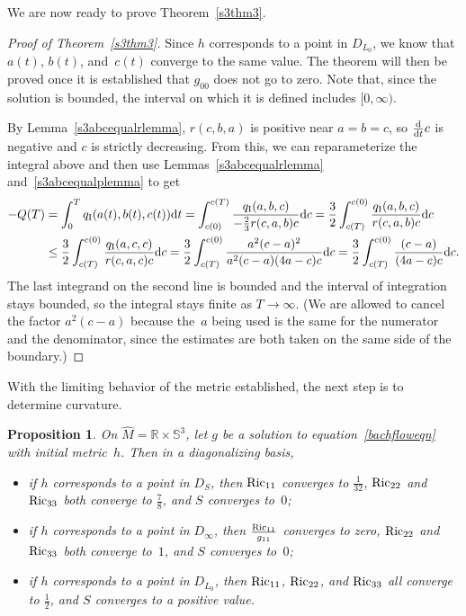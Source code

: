 \documentclass[pdftex]{sigma}
\numberwithin{equation}{section}
\newtheorem{Proposition}[Theorem]{Proposition}
 { \theoremstyle{definition}
\newtheorem{Definition}[Theorem]{Definition}
\newtheorem{Example}[Theorem]{Example}
\newtheorem{Remark}[Theorem]{Remark} }
\newcommand{\dtime}{\frac{{\rm d}}{{\rm d} t}} %
\begin{document}
We are now ready to prove Theorem~\ref{s3thm3}.

\begin{proof}[Proof of Theorem~\ref{s3thm3}]
Since $h$ corresponds to a point in $D_{L_0}$, we know that $a(t)$, $b(t)$, and~$c(t)$ converge to the same value. The theorem will then be proved once it is established that $g_{00}$ does not go to zero.
Note that, since the solution is bounded, the interval on which it is defined includes $[0, \infty)$.

By Lemma~\ref{s3abcequalrlemma}, $r(c, b, a)$ is positive near $a = b = c$, so $\dtime c$ is negative and $c$ is strictly decreasing. From this, we can reparameterize the integral above and then use Lemmas~\ref{s3abcequalrlemma} and~\ref{s3abcequalplemma} to get
\begin{align*}
-Q(T) &= \int_0^T q_{\rm I}(a(t), b(t), c(t)) {\rm d}t
	= \int_{c(0)}^{c(T)} \frac{q_{\rm I}(a, b, c)}{-\frac{2}{3} r(c, a, b) c} {\rm d} c
	= \frac{3}{2} \int_{c(T)}^{c(0)} \frac{q_{\rm I}(a, b, c)}{r(c, a, b) c} {\rm d} c \\
	& \leq \frac{3}{2} \int_{c(T)}^{c(0)} \frac{q_{\rm I}(a, c, c)}{r(c, a, c) c} {\rm d} c
= \frac{3}{2} \int_{c(T)}^{c(0)} \frac{a^2(c-a)^2}{a^2(c-a)(4a-c) c} {\rm d} c
	= \frac{3}{2} \int_{c(T)}^{c(0)} \frac{(c-a)}{(4a-c) c} {\rm d} c.
\end{align*}
The last integrand on the second line is bounded and the interval of integration stays bounded, so the integral stays finite as $T \rightarrow \infty$. (We are allowed to cancel the factor $a^2 (c-a)$ because the~$a$ being used is the same for the numerator and the denominator, since the estimates are both taken on the same side of the boundary.)
\end{proof}

With the limiting behavior of the metric established, the next step is to determine curvature.

\begin{Proposition} \label{s3ricprop}
On $\widehat{M} = \mathbb{R} \times \mathbb{S}^3$, let $g$ be a solution to equation~\eqref{bachfloweqn} with initial metric~$h$. Then in a diagonalizing basis,
\begin{itemize}\itemsep=0pt
\item if $h$ corresponds to a point in $D_S$, then ${\rm Ric}_{11}$ converges to $\frac{1}{32}$, ${\rm Ric}_{22}$ and ${\rm Ric}_{33}$ both converge to $\frac{7}{8}$, and $S$ converges to~$0$;
\item if $h$ corresponds to a point in $D_{\infty}$, then $\frac{{\rm Ric}_{11}}{g_{11}}$ converges to zero, ${\rm Ric}_{22}$ and ${\rm Ric}_{33}$ both converge to~$1$, and $S$ converges to~$0$;
\item if $h$ corresponds to a point in $D_{L_0}$, then ${\rm Ric}_{11}$, ${\rm Ric}_{22}$, and ${\rm Ric}_{33}$ all converge to $\frac{1}{2}$, and $S$ converges to a positive value.
\end{itemize}
\end{Proposition}
\end{document}
